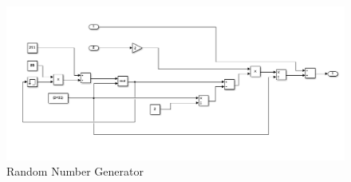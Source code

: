 \begin{figure}[H]
	\centering
	\includegraphics[width=1\linewidth]{../Graphiken/Simulink5}
	\caption{Random Number Generator}
	\label{fig:Simulink5}
\end{figure}